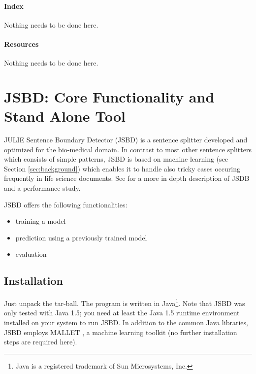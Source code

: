 \documentclass[11pt,a4paper,halfparskip]{scrartcl}
\begin{document}
\paragraph{Index}
Nothing needs to be done here.

\paragraph{Resources}
Nothing needs to be done here.




\clearpage
\section{JSBD: Core Functionality and Stand Alone Tool}
\label{sec_objective}

JULIE Sentence Boundary Detector (JSBD) is a sentence splitter
developed and optimized for the bio-medical domain. In contrast to
most other sentence splitters which consists of simple patterns, JSBD
is based on machine learning (see Section \ref{sec:background}) which
enables it to handle also tricky cases occuring frequently in life
science documents. See \cite{tomanek2007a} for a more in depth
description of JSDB and a performance study.


JSBD offers the following functionalities:
\begin{itemize}
\item training a model
\item prediction using a previously trained model
\item evaluation
\end{itemize}





\subsection{Installation}
Just unpack the tar-ball. The program is written in Java\footnote{Java
  is a registered trademark of Sun Microsystems, Inc.}. Note that JSBD
was only tested with Java 1.5; you need at least the Java 1.5 runtime
environment installed on your system to run JSBD. In addition to the
common Java libraries, JSBD employs \textsc{MALLET} \cite{mccallum2002}, a
machine learning toolkit (no further installation steps are
required here).
\end{document}
